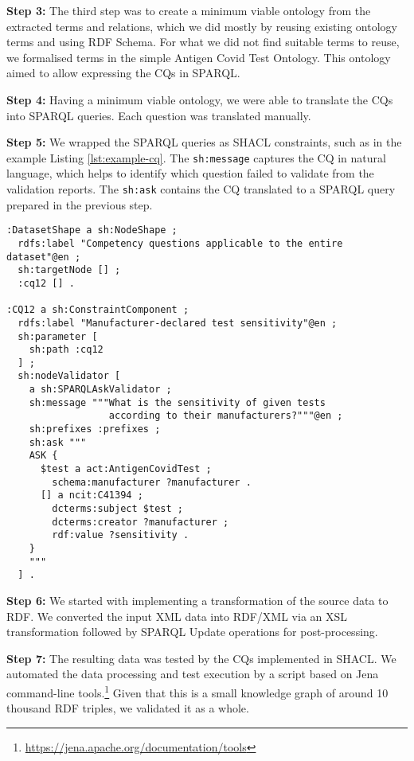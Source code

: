 \documentclass[
]{ceurart}
\begin{document}
\textbf{Step 3:} The third step was to create a minimum viable ontology from the extracted terms and relations, which we did mostly by reusing existing ontology terms and using RDF Schema. For what we did not find suitable terms to reuse, we formalised terms in the simple Antigen Covid Test Ontology. This ontology aimed to allow expressing the CQs in SPARQL.

\textbf{Step 4:} Having a minimum viable ontology, we were able to translate the CQs into SPARQL queries. Each question was translated manually.

\textbf{Step 5:} We wrapped the SPARQL queries as SHACL constraints, such as in the example Listing \ref{lst:example-cq}. The \texttt{sh:message} captures the CQ in natural language, which helps to identify which question failed to validate from the validation reports.  The \texttt{sh:ask} contains the CQ translated to a SPARQL query prepared in the previous step.

\begin{lstlisting}[language=turtle, caption=Example competency question in SHACL,label={lst:example-cq}]
:DatasetShape a sh:NodeShape ;
  rdfs:label "Competency questions applicable to the entire dataset"@en ;
  sh:targetNode [] ;
  :cq12 [] .
 
:CQ12 a sh:ConstraintComponent ;
  rdfs:label "Manufacturer-declared test sensitivity"@en ;
  sh:parameter [
    sh:path :cq12
  ] ;
  sh:nodeValidator [
    a sh:SPARQLAskValidator ;
    sh:message """What is the sensitivity of given tests
                  according to their manufacturers?"""@en ;
    sh:prefixes :prefixes ;
    sh:ask """
    ASK {
      $test a act:AntigenCovidTest ;
        schema:manufacturer ?manufacturer .
      [] a ncit:C41394 ;
        dcterms:subject $test ;
        dcterms:creator ?manufacturer ;
        rdf:value ?sensitivity .
    }
    """
  ] .
\end{lstlisting}

\textbf{Step 6:} We started with implementing a transformation of the source data to RDF. We converted the input XML data into RDF/XML via an XSL transformation followed by SPARQL Update operations for post-processing. 

\textbf{Step 7:} The resulting data was tested by the CQs implemented in SHACL. We automated the data processing and test execution by a script based on Jena command-line tools.\footnote{\url{https://jena.apache.org/documentation/tools}} Given that this is a small knowledge graph of around 10 thousand RDF triples, we validated it as a whole.
\end{document}

